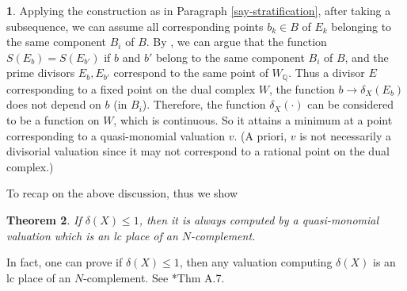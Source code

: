 \documentclass[12pt,reqno]{amsart}%
\newtheorem{thm}{Theorem}[section]
\theoremstyle{definition}
\newtheorem{say}[thm]{}
\theoremstyle{remark}
\newcommand{\bQ}{{\mathbb{Q}}}
\begin{document}
\begin{say}\label{say-locallyconstant}
Applying the construction as in Paragraph \ref{say-stratification}, after taking a subsequence, we can assume all corresponding points $b_k\in B$ of $E_k$ belonging to the same component $B_i$ of $B$.  By \cite[Thm. 1.8]{HMX13}, we can argue that the function $S(E_b)=S(E_{b'})$ if $b$ and $b'$ belong to the same component $B_i$ of $B$, and the prime divisors $E_b, E_{b'}$ correspond to the same point of $W_{\bQ}$.
Thus a divisor $E$ corresponding to a fixed point on the dual complex $W$, the function
$b\to \delta_X(E_b)$
does not depend on $b$ (in $B_i$). Therefore, the function $\delta_X(\cdot)$ can be considered to be a function on $W$, which is continuous. So it attains a minimum at a point corresponding to a quasi-monomial valuation $v$. (A priori, $v$ is not necessarily a divisorial valuation since it may not correspond to a rational point on the dual complex.)
\end{say}

 To recap on the above discussion, thus we show 
\begin{thm}\label{t-quasimini}
If $\delta(X)\le 1$, then it is always computed by a quasi-monomial valuation which is an lc place of an $N$-complement. 
\end{thm}
In fact, one can prove if $\delta(X)\le 1$, then any valuation computing $\delta(X)$ is an lc place of an $N$-complement. See \cite{BLX19}*{Thm A.7}.
\end{document}
